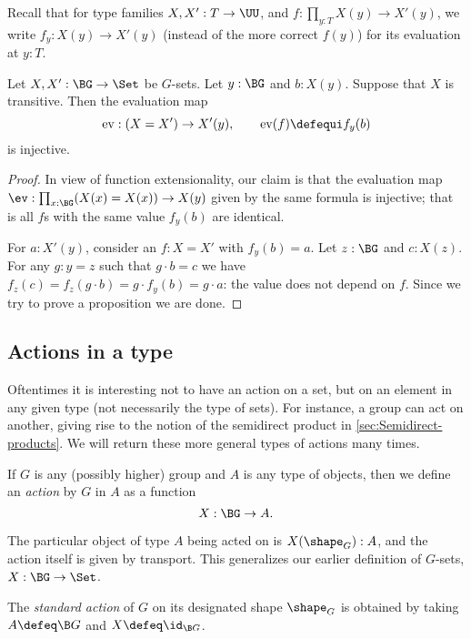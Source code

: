 Recall that for type families $X,X':T\to\UU$, and
$f:\prod_{y:T}X(y)\to X'(y)$, we write $f_y:X(y)\to X'(y)$ (instead of
the more correct $f(y)$) for its evaluation at $y:T$.
\begin{lemma}
  \label{lem:evisinjwhentransitive}
  Let $X,X':\BG\to\Set$ be $G$-sets. Let $y:\BG$ and $b:X(y)$. Suppose that $X$
  is transitive. Then the evaluation map
$$\mathrm{ev}:(X=X')\to X'(y),\qquad \mathrm{ev}(f)\defequi f_y(b)$$
is injective.
\end{lemma}
\begin{proof}
  In view of function extensionality, our claim is that the evaluation
  map $\ev:\prod_{x:\BG}(X(x)=X(x))\to X(y)$ given by the same formula
  is injective; that is all $f$s with the same value $f_y(b)$ are
  identical.

  For $a:X'(y)$, consider an $f:X=X'$ with $f_y(b)=a$. Let $z:\BG$ and
  $c:X(z)$.  For any $g:y=z$ such that $g\cdot b=c$ we have
  $f_z(c)=f_z(g\cdot b)=g \cdot f_y(b)=g \cdot a$: the value does not
  depend on $f$. Since we try to prove a proposition we are done.
\end{proof}

\subsection{Actions in a type}
\label{sec:actions}
Oftentimes it is interesting not to have an action on a set, but on an element in any given type (not necessarily the type of sets).  For instance, a group can act on another, giving rise to the notion of the semidirect product in \cref{sec:Semidirect-products}.  We will return these more general types of actions many times.

\begin{definition}\label{action}
  If $G$ is any (possibly higher) group and $A$ is any type of objects,
  then we define an \emph{action} by $G$ in %
  $A$ as a function
  \[
    X : \BG \to A.\qedhere
  \]
\end{definition}

The particular object of type $A$ being acted on is $X(\shape_G):A$,
and the action itself is given by transport.
This generalizes our earlier definition of $G$-sets, $X : \BG \to \Set$.

\begin{definition}\label{std-action}
  The \emph{standard action} of $G$ on its designated shape $\shape_G$ is obtained by
  taking $A \defeq \B G$ and $X \defeq \id_{\B G}$.
\end{definition}

